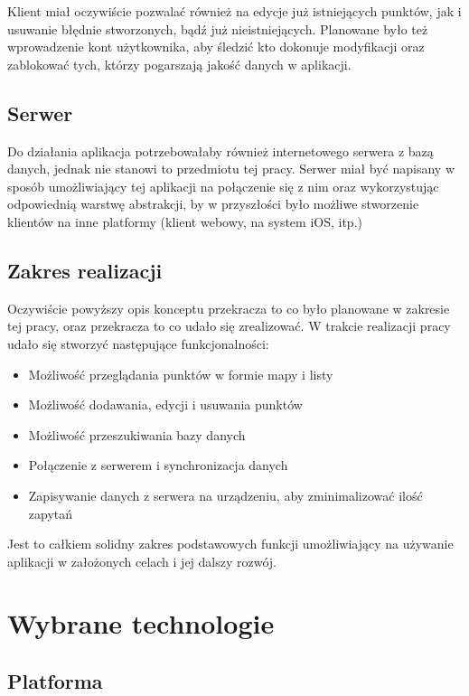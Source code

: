 \documentclass[polish,polish,a4paper,12pt]{article}
\let\sectioncmd\section
\renewcommand{\section}{\clearpage\sectioncmd}
\begin{document}
	Klient miał oczywiście pozwalać również na edycje już istniejących punktów, jak i usuwanie błędnie stworzonych, bądź już nieistniejących. Planowane było też wprowadzenie kont użytkownika, aby śledzić kto dokonuje modyfikacji oraz zablokować tych, którzy pogarszają jakość danych w aplikacji.

	\subsection{Serwer}

	Do działania aplikacja potrzebowałaby również internetowego serwera z bazą danych, jednak nie stanowi to przedmiotu tej pracy. Serwer miał być napisany w sposób umożliwiający tej aplikacji na połączenie się z nim oraz wykorzystując odpowiednią warstwę abstrakcji, by w przyszłości było możliwe stworzenie klientów na inne platformy (klient webowy, na system iOS, itp.)

	\subsection{Zakres realizacji}

	Oczywiście powyższy opis konceptu przekracza to co było planowane w zakresie tej pracy, oraz przekracza to co udało się zrealizować. W trakcie realizacji pracy udało się stworzyć następujące funkcjonalności:

	\begin{itemize}
		\item Możliwość przeglądania punktów w formie mapy i listy
		\item Możliwość dodawania, edycji i usuwania punktów
		\item Możliwość przeszukiwania bazy danych
		\item Połączenie z serwerem i synchronizacja danych
		\item Zapisywanie danych z serwera na urządzeniu, aby zminimalizować ilość zapytań
	\end{itemize}

	Jest to całkiem solidny zakres podstawowych funkcji umożliwiający na używanie aplikacji w założonych celach i jej dalszy rozwój.

\section{Wybrane technologie}\label{technology}
	\subsection{Platforma}
\end{document}
